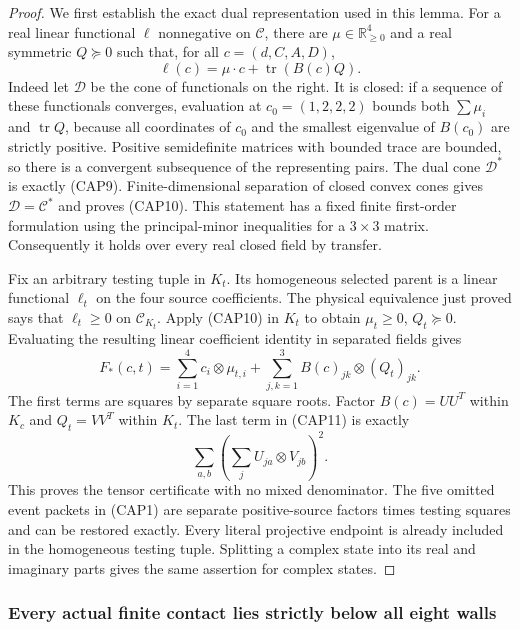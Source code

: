 \begin{proof}
We first establish the exact dual representation used in this lemma.
For a real linear functional $\ell$ nonnegative on $\mathcal C$,
there are $\mu\in\mathbb R_{\geq0}^4$ and a real symmetric
$Q\succeq0$ such that, for all $c=(d,C,A,D)$,
\[
\ell(c)=\mu\cdot c+\operatorname{tr}(B(c)Q).
\tag{CAP10}
\]
Indeed let $\mathcal D$ be the cone of functionals on the right.  It
is closed: if a sequence of these functionals converges, evaluation
at $c_0=(1,2,2,2)$ bounds both $\sum\mu_i$ and
$\operatorname{tr}Q$, because all coordinates of $c_0$ and the
smallest eigenvalue of $B(c_0)$ are strictly positive.  Positive
semidefinite matrices with bounded trace are bounded, so there is a
convergent subsequence of the representing pairs.  The dual cone
$\mathcal D^*$ is exactly (CAP9).  Finite-dimensional separation of
closed convex cones gives $\mathcal D=\mathcal C^*$ and proves
(CAP10).  This statement has a fixed finite first-order formulation
using the principal-minor inequalities for a $3\times3$ matrix.
Consequently it holds over every real closed field by transfer.

Fix an arbitrary testing tuple in $K_t$.  Its homogeneous selected
parent is a linear functional $\ell_t$ on the four source
coefficients.  The physical equivalence just proved says that
$\ell_t\geq0$ on $\mathcal C_{K_t}$.  Apply (CAP10) in $K_t$ to
obtain $\mu_t\geq0$, $Q_t\succeq0$.  Evaluating the resulting
linear coefficient identity in separated fields gives
\[
F_*(c,t)=\sum_{i=1}^4c_i\otimes\mu_{t,i}
 +\sum_{j,k=1}^3 B(c)_{jk}\otimes(Q_t)_{jk}.
\tag{CAP11}
\]
The first terms are squares by separate square roots.  Factor
$B(c)=UU^T$ within $K_c$ and $Q_t=VV^T$ within $K_t$.  The last
term in (CAP11) is exactly
\[
\sum_{a,b}\left(\sum_jU_{ja}\otimes V_{jb}\right)^2.
\]
This proves the tensor certificate with no mixed denominator.  The
five omitted event packets in (CAP1) are separate positive-source
factors times testing squares and can be restored exactly.  Every
literal projective endpoint is already included in the homogeneous
testing tuple.  Splitting a complex state into its real and imaginary
parts gives the same assertion for complex states.
\end{proof}

\subsubsection*{Every actual finite contact lies strictly below all eight walls}

